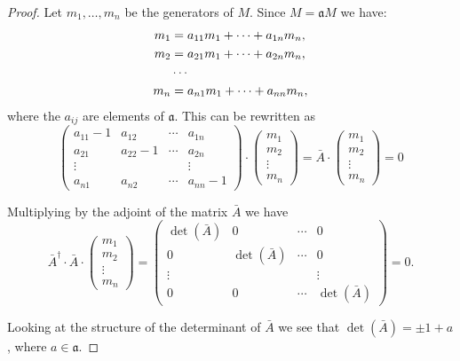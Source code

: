 {\begin{proof}
  Let $m_1, \ldots, m_n$ be the generators of $M$.  Since
  $M = \mathfrak{a}M$ we have:
  \[
\begin{aligned}
m_1 & = a_{11} m_1 + \dots + a_{1n}m_n, \\
m_2 & = a_{21} m_1 + \dots + a_{2n}m_n, \\
\null    & \cdots \\
m_n & = a_{n1} m_1 + \dots + a_{nn}m_n,
\end{aligned}
\]
where the $a_{ij}$ are elements of $\mathfrak{a}$.
This can be rewritten as
\[
\begin{pmatrix}
a_{11} - 1 & a_{12} & \cdots & a_{1n} \\
a_{21}     & a_{22} - 1 & \cdots & a_{2n} \\
\vdots  &  &         & \vdots \\
a_{n1} & a_{n2} & \cdots & a_{nn} - 1 
\end{pmatrix}
\cdot
\begin{pmatrix} m_1 \\ m_2 \\ \vdots \\ m_n \end{pmatrix}
=
\bar{A}
\cdot
\begin{pmatrix} m_1 \\ m_2 \\ \vdots \\ m_n \end{pmatrix}
= 0
\]

Multiplying by the adjoint of the matrix $\bar{A}$ we have
\[
\bar{A}^{\dagger} \cdot \bar{A} \cdot 
\begin{pmatrix} m_1 \\ m_2 \\ \vdots \\ m_n \end{pmatrix} =
\begin{pmatrix}
\det(\bar{A}) & 0 & \cdots & 0 \\
0 & \det(\bar{A}) & \cdots & 0 \\
\vdots & & & \vdots \\
0 & 0 & \cdots & \det(\bar{A}) 
\end{pmatrix} = 0.
\]

Looking at the structure of the determinant of $\bar{A}$ we see that
$\det(\bar{A}) = \pm 1 + a$, where $a \in \mathfrak{a}$.
\end{proof}


}
